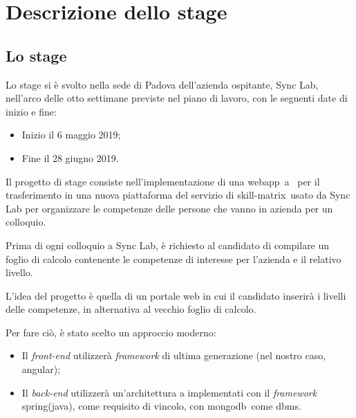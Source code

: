 
\chapter{Descrizione dello stage}\label{cap:descrizione-stage}



\section{Lo stage}

Lo stage si è svolto nella sede di Padova dell'azienda ospitante, Sync Lab, nell'arco delle otto settimane previste nel piano di lavoro, con le seguenti date di inizio e fine:
\begin{itemize}
	\item Inizio il 6 maggio 2019;
	\item Fine il 28 giugno 2019.
\end{itemize}
Il progetto di stage consiste nell'implementazione di una \gls{webapp}\gloss\ a \gloss\ per il trasferimento in una nuova piattaforma del servizio di \gls{skill-matrix}\gloss\ usato da Sync Lab per organizzare le competenze delle persone che vanno in azienda per un colloquio.

Prima di ogni colloquio a Sync Lab, è richiesto al candidato di compilare un foglio di calcolo contenente le competenze di interesse
per l'azienda e il relativo livello.

L'idea del progetto è quella di un portale web in cui il candidato inserirà i livelli delle competenze, in alternativa al vecchio foglio di calcolo.

Per fare ciò, è stato scelto un approccio moderno: 
\begin{itemize}
	\item Il \textit{front-end} utilizzerà \textit{framework} di ultima generazione (nel nostro caso, \gls{angular}\gloss);
	\item Il \textit{back-end} utilizzerà un'architettura a  implementati con il \textit{framework} \gls{spring}\gloss (\gls{java}\gloss), come requisito di vincolo, con \gls{mongodb}\gloss\ come \gls{dbms}\gloss.
\end{itemize}

